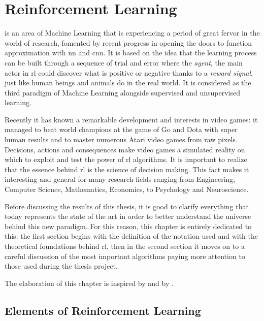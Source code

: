\chapter{Reinforcement Learning}

 is an area of Machine Learning that is experiencing a period of great fervor in the world of research, fomented by recent progress in  opening the doors to function approximation with \gls{nn} and \gls{cnn}. It is based on the idea that the learning process can be built through a sequence of trial and error where the \textit{agent}, the main actor in \gls{rl} could discover what is positive or negative thanks to a \textit{reward signal}, just like human beings and animals do in the real world. It is considered as the third paradigm of Machine Learning alongside supervised and unsupervised learning.

Recently it has known a remarkable development and interests in video games: it managed to beat world champions at the game of Go \cite{silver2016mastering} and Dota with super human results and to master numerous Atari video games \cite{mnih2013playing} from raw pixels. Decisions, actions and consequences make video games a simulated reality on which to exploit and test the power of \gls{rl} algorithms.
It is important to realize that the essence behind \gls{rl} is the science of decision making. This fact makes it interesting and general for many research fields ranging from Engineering, Computer Science, Mathematics, Economics, to Psychology and Neuroscience.

Before discussing the results of this thesis, it is good to clarify everything that today represents the state of the art in order to better understand the universe behind this new paradigm.
For this reason, this chapter is entirely dedicated to this: the first section begins with the definition of the notation used and with the theoretical foundations behind \gls{rl}, then in the second section it moves on to a careful discussion of the most important algorithms paying more attention to those used during the thesis project.

The elaboration of this chapter is inspired by \cite{silver2015lectures} and by \cite{sutton2018reinforcement}.

\section{Elements of Reinforcement Learning}

